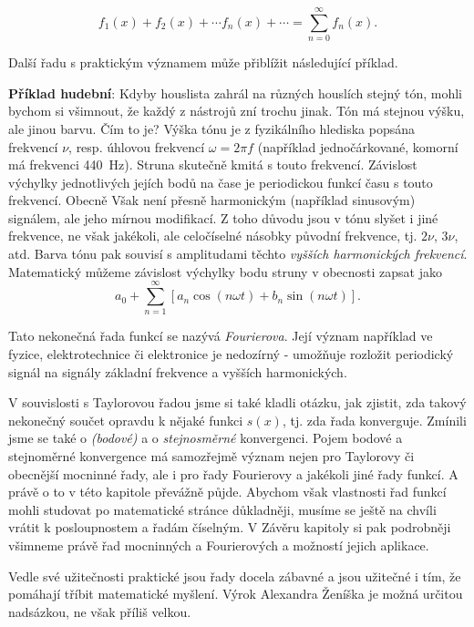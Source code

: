   \begin{equation*}
    f_1(x) + f_2(x) + \cdots f_n(x) + \cdots = \sum_{n=0}^\infty f_n(x).
  \end{equation*}

  Další řadu s praktickým významem může přiblížit následující příklad.

  \textbf{Příklad hudební}: Kdyby houslista zahrál na různých houslích stejný tón, mohli bychom si
  všimnout, že každý z nástrojů zní trochu jinak. Tón má stejnou výšku, ale jinou barvu. Čím to je?
  Výška tónu je z fyzikálního hlediska popsána frekvencí \(\nu\), resp. úhlovou frekvencí \(\omega
  = 2\pi f\) (například jednočárkované, komorní  má frekvenci \qty{440}{\Hz}). Struna skutečně
  kmitá s touto frekvencí. Závislost výchylky jednotlivých jejích bodů na čase je periodickou funkcí
  času s touto frekvencí. Obecně Však není přesně harmonickým (například sinusovým) signálem, ale
  jeho mírnou modifikací. Z toho důvodu jsou v tónu slyšet i jiné frekvence, ne však jakékoli, ale
  celočíselné násobky původní frekvence, tj. \(2\nu\), \(3\nu\), atd. Barva tónu pak souvisí s
  amplitudami těchto \emph{vyšších harmonických frekvencí}. Matematický můžeme závislost výchylky
  bodu struny v obecnosti zapsat jako
  \begin{equation*}
    a_0 + \sum_{n=1}^\infty[a_n\cos(n\omega t) + b_n\sin(n\omega t)].
  \end{equation*}

  Tato nekonečná řada funkcí se nazývá \emph{Fourierova}. Její význam například ve fyzice,
  elektrotechnice či elektronice je nedozírný - umožňuje rozložit periodický signál na signály
  základní frekvence a vyšších harmonických.

  V souvislosti s Taylorovou řadou jsme si také kladli otázku, jak zjistit, zda takový nekonečný
  součet opravdu  k nějaké funkci \(s(x)\), tj. zda řada konverguje. Zmínili jsme se
  také o  \emph{(bodové)} a o \emph{stejnosměrné} konvergenci. Pojem bodové a
  stejnoměrné konvergence má samozřejmě význam nejen pro Taylorovy či obecnější mocninné řady, ale i
  pro řady Fourierovy a jakékoli jiné řady funkcí. A právě o to v této kapitole převážně půjde.
  Abychom však vlastnosti řad funkcí mohli studovat po matematické stránce důkladněji, musíme se
  ještě na chvíli vrátit k posloupnostem a řadám číselným. V Závěru kapitoly si pak podrobněji
  všimneme právě řad mocninných a Fourierových a možností jejich aplikace.

  Vedle své užitečnosti praktické jsou řady docela zábavné a jsou užitečné i tím, že pomáhají tříbit
  matematické myšlení. Výrok Alexandra Ženíška   je možná určitou nadsázkou, ne však příliš velkou.

